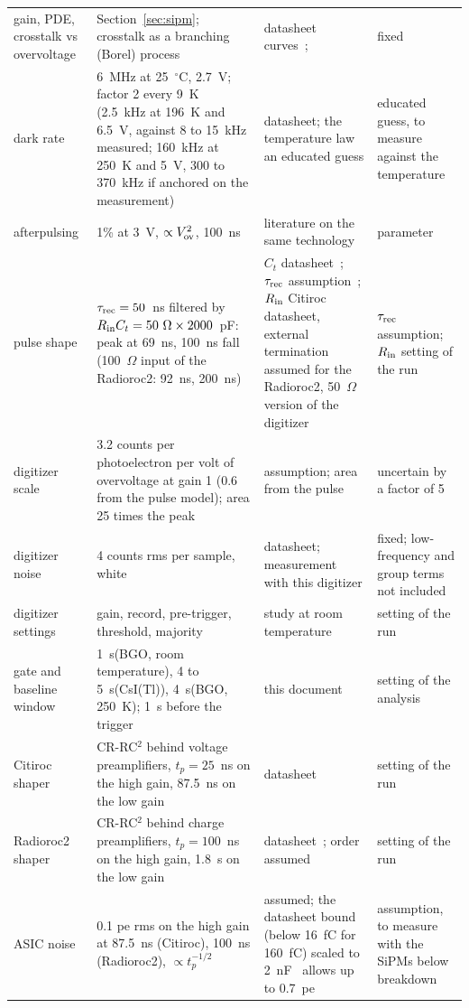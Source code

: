 \documentclass[11pt]{article}
\newcommand{\us}{\textmu s\xspace}
\newcommand{\csitl}{CsI(Tl)\xspace}
\begin{document}
\begin{table}[htb]
\begin{tabular}{p{} p{} p{} p{}}
gain, PDE, crosstalk vs overvoltage & Section~\ref{sec:sipm}; crosstalk as a branching (Borel) process & datasheet curves~\cite{hpk}; \cite{vinogradov} & fixed \\
dark rate & $6$~MHz at 25~$^\circ$C, 2.7~V; factor 2 every 9~K (2.5~kHz at 196~K and 6.5~V, against 8 to 15~kHz measured; 160~kHz at 250~K and 5~V, 300 to 370~kHz if anchored on the measurement) & datasheet; the temperature law an educated guess & educated guess, to measure against the temperature \\
afterpulsing & 1\% at 3~V, $\propto V_{\rm ov}^2$, 100~ns & literature on the same technology & parameter \\
pulse shape & $\tau_{\rm rec} = 50$~ns filtered by $R_{\rm in} C_t = 50~\Omega \times 2000$~pF: peak at 69~ns, 100~ns fall (100~$\Omega$ input of the Radioroc2: 92~ns, 200~ns) & $C_t$ datasheet~\cite{hpk}; $\tau_{\rm rec}$ assumption~\cite{kampert,cattaneo}; $R_{\rm in}$ Citiroc datasheet, external termination assumed for the Radioroc2, 50~$\Omega$ version of the digitizer & $\tau_{\rm rec}$ assumption; $R_{\rm in}$ setting of the run \\
digitizer scale & 3.2 counts per photoelectron per volt of overvoltage at gain 1 (0.6 from the pulse model); area 25 times the peak & assumption; area from the pulse & uncertain by a factor of 5 \\
digitizer noise & 4 counts rms per sample, white & datasheet; measurement with this digitizer & fixed; low-frequency and group terms not included \\
digitizer settings & gain, record, pre-trigger, threshold, majority & study at room temperature & setting of the run \\
gate and baseline window & 1~\us (BGO, room temperature), 4 to 5~\us (\csitl), 4~\us (BGO, 250~K); 1~\us before the trigger & this document & setting of the analysis \\
Citiroc shaper & CR-RC$^2$ behind voltage preamplifiers, $t_p = 25$~ns on the high gain, 87.5~ns on the low gain & datasheet~\cite{citiroc} & setting of the run \\
Radioroc2 shaper & CR-RC$^2$ behind charge preamplifiers, $t_p = 100$~ns on the high gain, 1.8~\us on the low gain & datasheet~\cite{radioroc}; order assumed & setting of the run \\
ASIC noise & 0.1 pe rms on the high gain at 87.5~ns (Citiroc), 100~ns (Radioroc2), $\propto t_p^{-1/2}$ & assumed; the datasheet bound (below 16~fC for 160~fC) scaled to 2~nF~\cite{radioroc,spieler} allows up to 0.7~pe & assumption, to measure with the SiPMs below breakdown \\

\end{tabular}
\end{table}
\end{document}
